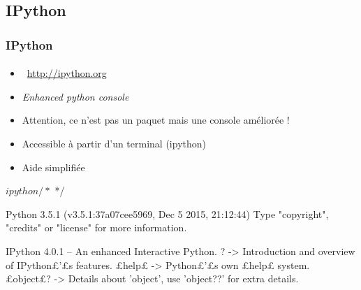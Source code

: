 \subsection{IPython}
\begin{frame}[fragile]
\frametitle{IPython}
\framesubtitle{}
\begin{itemize}
 \item {} \, \url{http://ipython.org}
 \item \emph{Enhanced python console}
 \item Attention, ce n'est pas un paquet mais une console améliorée !
 \item Accessible à partir d'un terminal (ipython) 
 \item Aide simplifiée
\end{itemize}

\begin{shell}
$ ipython /* $ */
\end{shell} 

\begin{pythonConsole}
Python 3.5.1 (v3.5.1:37a07cee5969, Dec  5 2015, 21:12:44) 
Type "copyright", "credits" or "license" for more information.

IPython 4.0.1 -- An enhanced Interactive Python.
?         -> Introduction and overview of IPython£'£s features.
£help£      -> Python£'£s own £help£ system.
£object£?   -> Details about 'object', use 'object??' for extra details.
\end{pythonConsole}
\end{frame}
